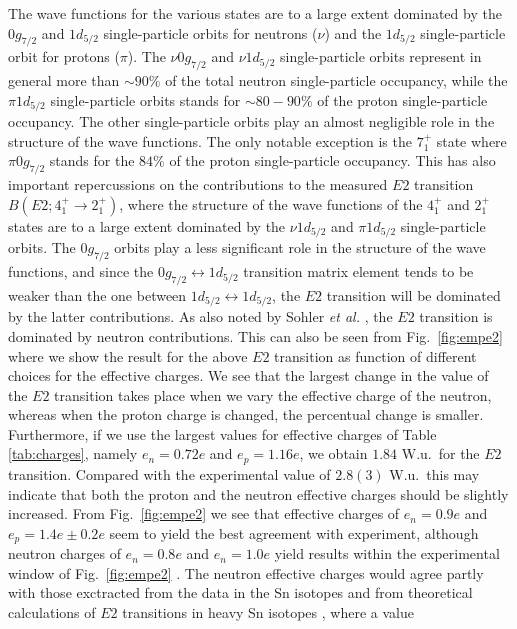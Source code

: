 The wave functions for the various states are to a large extent
dominated by the $0g_{7/2}$ and $1d_{5/2}$ single-particle orbits
for neutrons ($\nu$)
and the $1d_{5/2}$ single-particle
orbit for protons ($\pi$). 
The $\nu 0g_{7/2}$ and $\nu 1d_{5/2}$ single-particle orbits represent
in general more than $\sim 90\%$ of the total neutron single-particle
occupancy, while the  $\pi 1d_{5/2}$ single-particle orbits stands for 
$\sim 80-90\%$ of the proton single-particle occupancy. The other single-particle
orbits play  an almost negligible role in the structure of the wave functions.
The only notable exception is the $7_1^{+}$ state where $\pi 0g_{7/2}$
stands for the $84\%$ of the proton single-particle occupancy.
This has also important repercussions on the contributions to the
measured $E2$ transition $B(E2;4_1^+\rightarrow 2_1^+)$, where  the 
structure of the 
wave functions of the  
$4_1^+$ and $2_1^+$ states are to  a large extent dominated by the 
$\nu 1d_{5/2}$ and $\pi 1d_{5/2}$ single-particle orbits. The $0g_{7/2}$ orbits
play a less significant  role in the structure of the wave functions, 
and since the $0g_{7/2}\leftrightarrow 1d_{5/2}$ transition matrix element
tends to be weaker
than the  one  between $1d_{5/2}\leftrightarrow 1d_{5/2}$, the $E2$
transition will be dominated by  the latter contributions.
As also noted by Sohler {\em et al.} \cite{sb106}, the $E2$ transition is dominated by
neutron contributions.  This can also be seen from Fig.\  \ref{fig:empe2} 
where we show the result for the above $E2$ transition as function of 
different choices for the effective charges. 
We see that the largest change in the value of the $E2$ transition takes place
when we vary the effective charge of the neutron, whereas when the proton charge is
changed, the percentual change is smaller. 
Furthermore, if we use the largest values for effective charges of Table
\ref{tab:charges}, namely $e_n=0.72e$ and $e_p=1.16e$, we obtain $1.84$ W.u.\ for the
$E2$ transition. Compared with the experimental value
of $2.8(3)$ W.u.\ this may indicate that both the proton and the neutron effective
charges should be slightly increased. From Fig.\ 
\ref{fig:empe2} we see that effective charges of $e_n=0.9e $ and 
$e_p=1.4e\pm 0.2e$
seem to yield the best agreement with experiment, although
neutron charges of $e_n=0.8e$ and $e_n=1.0e$ yield results
within the experimental window of Fig.\ \ref{fig:empe2} . 
The neutron effective charges
would agree partly with those exctracted from the data in the Sn isotopes 
\cite{ssbw87} and from theoretical
calculations of $E2$ transitions in heavy Sn isotopes \cite{ehho98}, where a value
